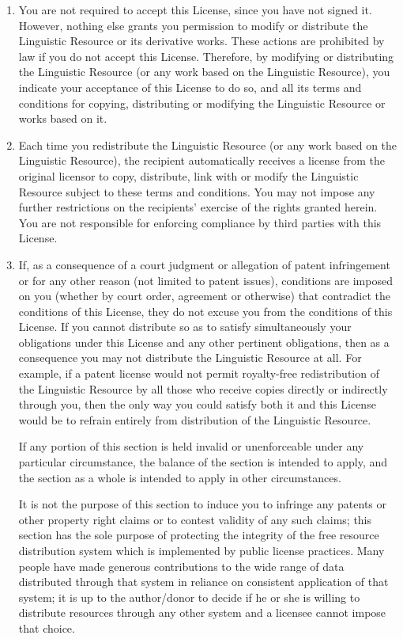 \begin{enumerate}
\item

You are not required to accept this License, since you have not signed it. However, nothing 
else grants you permission to modify or distribute the Linguistic Resource or its derivative 
works. These actions are prohibited by law if you do not accept this License. Therefore, by 
modifying or distributing the Linguistic Resource (or any work based on the Linguistic 
Resource), you indicate your acceptance of this License to do so, and all its terms and 
conditions for copying, distributing or modifying the Linguistic Resource or works based on it.

\item

Each time you redistribute the Linguistic Resource (or any work based on the Linguistic 
Resource), the recipient automatically receives a license from the original licensor to 
copy, distribute, link with or modify the Linguistic Resource subject to these terms and 
conditions. You may not impose any further restrictions on the recipients' exercise of 
the rights granted herein. You are not responsible for enforcing compliance by third 
parties with this License.

\item

If, as a consequence of a court judgment or allegation of patent infringement or for any 
other reason (not limited to patent issues), conditions are imposed on you (whether by 
court order, agreement or otherwise) that contradict the conditions of this License, they 
do not excuse you from the conditions of this License. If you cannot distribute so as 
to satisfy simultaneously your obligations under this License and any other pertinent 
obligations, then as a consequence you may not distribute the Linguistic Resource at all. 
For example, if a patent license would not permit royalty-free redistribution of the Linguistic 
Resource by all those who receive copies directly or indirectly through you, then the only 
way you could satisfy both it and this License would be to refrain entirely from distribution 
of the Linguistic Resource.

If any portion of this section is held invalid or unenforceable under any particular 
circumstance, the balance of the section is intended to apply, and the section as a 
whole is intended to apply in other circumstances.

It is not the purpose of this section to induce you to infringe any patents or other 
property right claims or to contest validity of any such claims; this section has the 
sole purpose of protecting the integrity of the free resource distribution system which 
is implemented by public license practices. Many people have made generous contributions 
to the wide range of data distributed through that system in reliance on consistent 
application of that system; it is up to the author/donor to decide if he or she is willing 
to distribute resources through any other system and a licensee cannot impose that choice.


\end{enumerate}
